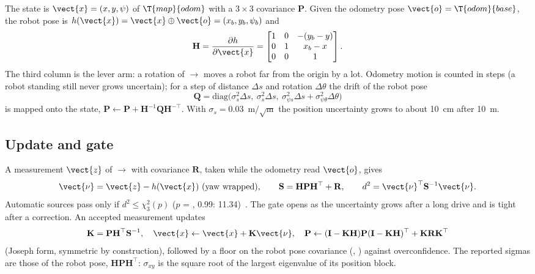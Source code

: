 The state is $\vect{x} = (x, y, \psi)$ of $\T{map}{odom}$ with a $3\times3$ covariance
$\mathbf{P}$. Given the odometry pose $\vect{o} = \T{odom}{base}$, the robot pose is
$h(\vect{x}) = \vect{x} \oplus \vect{o} = (x_b, y_b, \psi_b)$ and
\begin{equation}
  \mathbf{H} = \frac{\partial h}{\partial \vect{x}} =
  \begin{bmatrix} 1 & 0 & -(y_b - y) \\ 0 & 1 & x_b - x \\ 0 & 0 & 1 \end{bmatrix}.
\end{equation}
The third column is the lever arm: a rotation of $\to$ moves a robot far from
the  origin by a lot. Odometry motion is counted in steps (a robot standing still
never grows uncertain); for a step of distance $\Delta s$ and rotation $\Delta\theta$ the drift
of the robot pose
\begin{equation}
  \mathbf{Q} = \mathrm{diag}\big(\sigma_s^2\Delta s,\ \sigma_s^2\Delta s,\ \sigma_{\psi s}^2
  \Delta s + \sigma_{\psi\theta}^2 \Delta\theta\big)
\end{equation}
is mapped onto the state, $\mathbf{P} \leftarrow \mathbf{P} + \mathbf{H}^{-1}\mathbf{Q}
\mathbf{H}^{-\top}$. With $\sigma_s = 0.03$~m$/\sqrt{\mathrm{m}}$ the position uncertainty
grows to about 10~cm after 10~m.

\subsection{Update and gate}

A measurement $\vect{z}$ of $\to$ with covariance $\mathbf{R}$, taken
while the odometry read $\vect{o}$, gives
\begin{equation}
  \vect{\nu} = \vect{z} - h(\vect{x})\ (\text{yaw wrapped}), \qquad
  \mathbf{S} = \mathbf{H}\mathbf{P}\mathbf{H}^\top + \mathbf{R}, \qquad
  d^2 = \vect{\nu}^\top\mathbf{S}^{-1}\vect{\nu}.
\end{equation}
Automatic sources pass only if $d^2 \le \chi^2_3(p)$ ($p$ = ,
0.99: 11.34)~\cite{barshalom2001estimation}. The gate opens as the uncertainty grows after a
long drive and is tight after a correction. An accepted measurement updates
\begin{equation}
  \mathbf{K} = \mathbf{P}\mathbf{H}^\top\mathbf{S}^{-1}, \quad
  \vect{x} \leftarrow \vect{x} + \mathbf{K}\vect{\nu}, \quad
  \mathbf{P} \leftarrow (\mathbf{I} - \mathbf{K}\mathbf{H})\mathbf{P}(\mathbf{I} -
  \mathbf{K}\mathbf{H})^\top + \mathbf{K}\mathbf{R}\mathbf{K}^\top
\end{equation}
(Joseph form, symmetric by construction), followed by a floor on the robot pose covariance
(, ) against overconfidence. The reported sigmas are
those of the robot pose, $\mathbf{H}\mathbf{P}\mathbf{H}^\top$: $\sigma_{xy}$ is the square
root of the largest eigenvalue of its position block.

